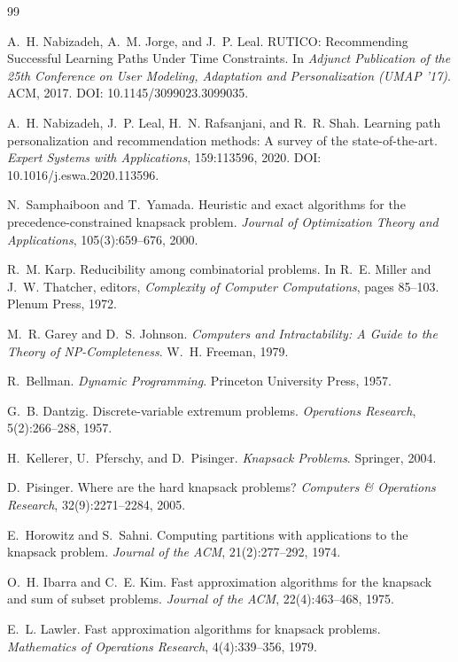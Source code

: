 \clearpage
{}
\begin{thebibliography}{99}\small

 A.~H. Nabizadeh, A.~M. Jorge, and J.~P. Leal. RUTICO: Recommending Successful Learning Paths Under Time Constraints. In \emph{Adjunct Publication of the 25th Conference on User Modeling, Adaptation and Personalization (UMAP '17)}. ACM, 2017. DOI: 10.1145/3099023.3099035.

 A.~H. Nabizadeh, J.~P. Leal, H.~N. Rafsanjani, and R.~R. Shah. Learning path personalization and recommendation methods: A survey of the state-of-the-art. \emph{Expert Systems with Applications}, 159:113596, 2020. DOI: 10.1016/j.eswa.2020.113596.

 N.~Samphaiboon and T.~Yamada. Heuristic and exact algorithms for the precedence-constrained knapsack problem. \emph{Journal of Optimization Theory and Applications}, 105(3):659--676, 2000.

 R.~M. Karp. Reducibility among combinatorial problems. In R.~E. Miller and J.~W. Thatcher, editors, \emph{Complexity of Computer Computations}, pages 85--103. Plenum Press, 1972.

 M.~R. Garey and D.~S. Johnson. \emph{Computers and Intractability: A Guide to the Theory of NP-Completeness}. W.~H. Freeman, 1979.

 R.~Bellman. \emph{Dynamic Programming}. Princeton University Press, 1957.

 G.~B. Dantzig. Discrete-variable extremum problems. \emph{Operations Research}, 5(2):266--288, 1957.

 H.~Kellerer, U.~Pferschy, and D.~Pisinger. \emph{Knapsack Problems}. Springer, 2004.

 D.~Pisinger. Where are the hard knapsack problems? \emph{Computers \& Operations Research}, 32(9):2271--2284, 2005.

 E.~Horowitz and S.~Sahni. Computing partitions with applications to the knapsack problem. \emph{Journal of the ACM}, 21(2):277--292, 1974.

 O.~H. Ibarra and C.~E. Kim. Fast approximation algorithms for the knapsack and sum of subset problems. \emph{Journal of the ACM}, 22(4):463--468, 1975.

 E.~L. Lawler. Fast approximation algorithms for knapsack problems. \emph{Mathematics of Operations Research}, 4(4):339--356, 1979.


\end{thebibliography}
